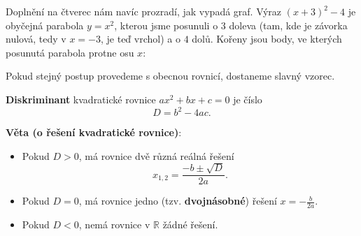 Doplnění na čtverec nám navíc prozradí, jak vypadá graf. Výraz ${(x + 3)}^2 - 4$ je obyčejná parabola $y = x^2$, kterou jsme posunuli o $3$ doleva (tam, kde je závorka nulová, tedy v $x = -3$, je teď vrchol) a o $4$ dolů. Kořeny jsou body, ve kterých posunutá parabola protne osu $x$:
\begin{center}
\end{center}

Pokud stejný postup provedeme s obecnou rovnicí, dostaneme slavný vzorec.

\begin{definitionbox}
  \textbf{Diskriminant} kvadratické rovnice $ax^2 + bx + c = 0$ je číslo
  \begin{equation*}
    D = b^2 - 4ac.
  \end{equation*}

  \textbf{Věta (o řešení kvadratické rovnice)}:
  \begin{itemize}
    \item Pokud $D > 0$, má rovnice dvě různá reálná řešení
    \begin{equation*}
      x_{1,2} = \frac{-b\pm\sqrt{D}}{2a}.
    \end{equation*}
    \item Pokud $D = 0$, má rovnice jedno (tzv. \textbf{dvojnásobné}) řešení $x = -\frac{b}{2a}$.
    \item Pokud $D < 0$, nemá rovnice v $\mathbb{R}$ žádné řešení.
  \end{itemize}
\end{definitionbox}

